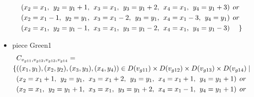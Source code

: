 \begin{appendices}
\begin{itemize}
\begin{align*}
&(x_{2} = x_{1},\hspace{1ex}y_{2} = y_{1}+1,\hspace{1ex}x_{3} = x_{1}, \hspace{1ex}y_{3} = y_{1}+2,\hspace{1ex}x_{4} = x_{1},\hspace{1ex}y_{4} = y_{1}+3)\hspace{1ex} or\\
&(x_{2} = x_{1}-1,\hspace{1ex}y_{2} = y_{1},\hspace{1ex}x_{3} = x_{1}-2,\hspace{1ex} y_{3} = y_{1},\hspace{1ex}x_{4} = x_{1}-3,\hspace{1ex}y_{4} = y_{1})\hspace{1ex} or\\
&(x_{2} = x_{1},\hspace{1ex}y_{2} = y_{1}-1,\hspace{1ex}x_{3} = x_{1}, \hspace{1ex}y_{3} = y_{1}-2,\hspace{1ex}x_{4} = x_{1},\hspace{1ex}y_{4} = y_{1}-3)\hspace{3ex} \}
\end{align*}
 \item piece Green1\\
 \begin{align*}
&\Const{g11}{g12}{g13}{g14}=
\\\{&((x_{1},y_{1}),(x_{2},y_{2}),(x_{3},y_{3}),(x_{4},y_{4}))\in \Domain{g11}\times \Domain{g12}\times\Domain{g13}\times\Domain{g14}\mid\\
&(x_{2} = x_{1} + 1,\hspace{1ex}y_{2} = y_{1},\hspace{1ex}x_{3} = x_{1} + 2, \hspace{1ex}y_{3} = y_{1},\hspace{1ex}x_{4} = x_{1}+1,\hspace{1ex}y_{4} = y_{1}+1)\hspace{1ex} or\\
&(x_{2} = x_{1},\hspace{1ex}y_{2} = y_{1}+1,\hspace{1ex}x_{3} = x_{1}, \hspace{1ex}y_{3} = y_{1}+2,\hspace{1ex}x_{4} = x_{1}-1,\hspace{1ex}y_{4} = y_{1}+1)\hspace{1ex} or\\

\end{align*}
\end{itemize}
\end{appendices}
